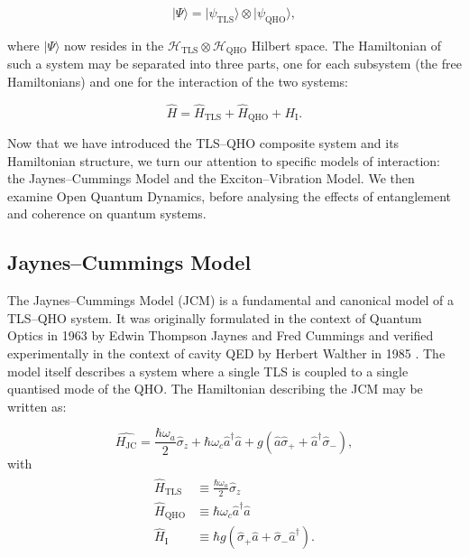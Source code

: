 \documentclass[12pt]{article}
\begin{document}
\begin{equation}
    |\Psi\rangle = |\psi_{\scriptscriptstyle \text{TLS}}\rangle \otimes |\psi_{\scriptscriptstyle \text{QHO}}\rangle,
\end{equation}

where $|\Psi\rangle$ now resides in the $\mathcal{H}_{\scriptscriptstyle \text{TLS}} \otimes\mathcal{H}_{\scriptscriptstyle \text{QHO}}$ Hilbert space. The Hamiltonian of such a system may be separated into three parts, one for each subsystem (the free Hamiltonians) and one for the interaction of the two systems:

\begin{equation}
    \hat{H} = \hat{H}_{\scriptscriptstyle \text{TLS}} + \hat{H}_{\scriptscriptstyle \text{QHO}} + H_{\scriptscriptstyle \text{I}}.
\end{equation}

Now that we have introduced the TLS–QHO composite system and its Hamiltonian structure, we turn our attention to specific models of interaction: the Jaynes–Cummings Model and the Exciton–Vibration Model. We then examine Open Quantum Dynamics, before analysing the effects of entanglement and coherence on quantum systems.

\subsection{Jaynes--Cummings Model} \label{JCM_Theory}

The Jaynes--Cummings Model (JCM) is a fundamental and canonical model of a TLS--QHO system. It was originally formulated in the context of Quantum Optics in 1963 by Edwin Thompson Jaynes and Fred Cummings \cite{Context1963-JC_Original} and verified experimentally in the context of cavity QED by Herbert Walther in 1985 \cite{Context1993-JC_Verification}. The model itself describes a system where a single TLS is coupled to a single quantised mode of the QHO. The Hamiltonian describing the JCM may be written as:

\begin{equation} \label{JC_H}
    \hat{H_{\scriptscriptstyle \text{JC}}} = \frac{\hbar\omega_a}{2}\hat{\sigma}_z + \hbar\omega_c\hat{a}^\dagger \hat{a} + g(\hat{a}\hat{\sigma}_{+} + \hat{a}^\dagger\hat{\sigma}_{-}), 
\end{equation} 
with 
\begin{align*}
    \begin{aligned}
        \hat{H}_{\scriptscriptstyle \text{TLS}} &\equiv \frac{\hbar\omega_a}{2}\hat{\sigma}_z \\
        \hat{H}_{\scriptscriptstyle \text{QHO}} &\equiv \hbar\omega_c\hat{a}^\dagger \hat{a} \\
        \hat{H}_{\scriptscriptstyle \text{I}} &\equiv \hbar g(\hat{\sigma}_{+}\hat{a} +\hat{\sigma}_{-}\hat{a}^\dagger).
    \end{aligned}
\end{align*}
\end{document}
